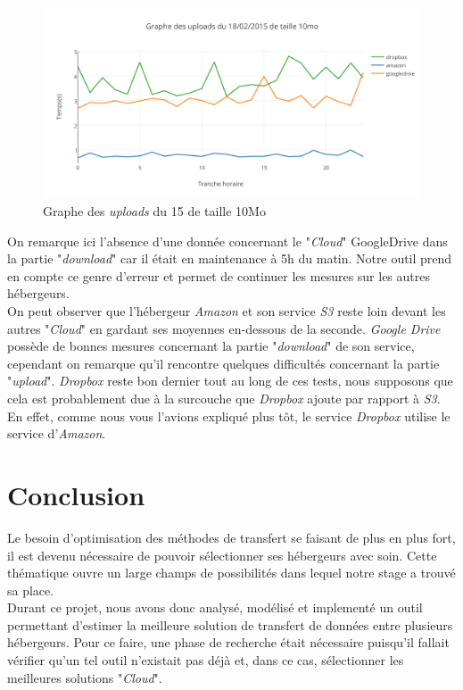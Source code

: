 \documentclass[10pt]{article}
\begin{document}
\begin{figure}[h] \centering
\includegraphics[scale=0.65]{graphe_des_uploads_du_18022015_de_taille_10mo.png}
\caption{Graphe des \textit{uploads} du 15 de taille 10Mo} \end{figure}

On remarque ici l'absence d'une donnée concernant le "\textit{Cloud}"
GoogleDrive dans la partie "\textit{download}" car il était en maintenance à 5h
du matin. Notre outil prend en compte ce genre d'erreur et permet de continuer
les mesures sur les autres hébergeurs.\\

On peut observer que l'hébergeur \textit{Amazon} et son service \textit{S3}
reste loin devant les autres "\textit{Cloud}" en gardant ses moyennes
en-dessous de la seconde.  \textit{Google Drive} possède de bonnes mesures
concernant la partie "\textit{download}" de son service, cependant on remarque
qu'il rencontre quelques difficultés concernant la partie "\textit{upload}".
\textit{Dropbox} reste bon dernier tout au long de ces tests, nous supposons
que cela est probablement due à la surcouche que \textit{Dropbox} ajoute par
rapport à \textit{S3}. En effet, comme nous vous l'avions expliqué plus tôt, le
service \textit{Dropbox} utilise le service d'\textit{Amazon}.


\section{Conclusion}

Le besoin d'optimisation des méthodes de transfert se faisant de plus en plus 
fort, il est devenu nécessaire de pouvoir sélectionner ses hébergeurs avec 
soin. Cette thématique ouvre un large champs de possibilités dans lequel notre
stage a trouvé sa place.\\ 

Durant ce projet, nous avons donc analysé, modélisé et implementé un outil
permettant d'estimer la meilleure solution de transfert de données entre
plusieurs hébergeurs. Pour ce faire, une phase de recherche était nécessaire
puisqu'il fallait vérifier qu'un tel outil n'existait pas déjà et, dans ce cas,
sélectionner les meilleures solutions "\textit{Cloud}".\\
\end{document}
